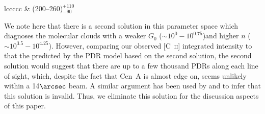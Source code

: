 \documentclass[preprint2]{aastex}
\begin{document}
\begin{deluxetable}{lccccc}
 	& (200--260)$^{+110}_{-90}$ \\
 \enddata
\end{deluxetable}

We note here that there is a second solution in this parameter space which diagnoses the molecular clouds with a weaker $G_{0}$ ($\sim 10^{0}-10^{0.75}$)and higher $n$ ($\sim 10^{3.5}-10^{4.25}$).  However, comparing our observed [C~\textsc{ii}] integrated intensity to that the predicted by the PDR model based on the second solution, the second solution would suggest that there are up to a few thousand PDRs along each line of sight, which, despite the fact that Cen~A is almost edge on, seems unlikely within a 14$\arcsec$ beam.  A similar argument has been used by \citet{2005A&A...441..961K} and \citet{parkin_2013} to infer that this solution is invalid.  Thus, we eliminate this solution for the discussion aspects of this paper.

\end{document}
